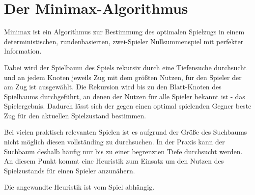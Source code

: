 \section{Der Minimax-Algorithmus}

Minimax ist ein Algorithmus zur Bestimmung des optimalen Spielzugs in einem deterministischen, rundenbasierten, zwei-Spieler Nullsummenspiel mit perfekter Information.

Dabei wird der Spielbaum des Spiels rekursiv durch eine Tiefensuche durchsucht und an jedem Knoten jeweils Zug mit dem größten Nutzen, für den Spieler der am Zug ist ausgewählt.
Die Rekursion wird bis zu den Blatt-Knoten des Spielbaums durchgeführt, an denen der Nutzen für alle Spieler bekannt ist - das Spielergebnis.
Dadurch lässt sich der gegen einen optimal spielenden Gegner beste Zug für den aktuellen Spielzustand bestimmen.

Bei vielen praktisch relevanten Spielen ist es aufgrund der Größe des Suchbaums nicht möglich diesen vollständing zu durchsuchen.
In der Praxis kann der Suchbaum deshalb häufig nur bis zu einer begrenzten Tiefe durchsucht werden. An diesem Punkt kommt eine Heuristik zum Einsatz um den Nutzen des Spielzustands für einen Spieler anzunähern.

Die angewandte Heuristik ist vom Spiel abhängig.
